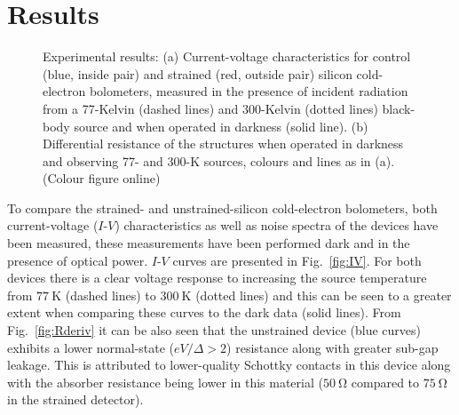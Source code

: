 \documentclass[final]{svjour2}
\begin{document}
\section{Results}
\begin{figure}[htb]
\centering
{}
\caption{Experimental results: (a) Current-voltage characteristics for control (blue, inside pair) and strained (red, outside pair) silicon cold-electron bolometers, measured in the presence of incident radiation from a 77-Kelvin (dashed lines) and 300-Kelvin (dotted lines) black-body source and when operated in darkness (solid line). (b) Differential resistance of the structures when operated in darkness and observing 77- and 300-K sources, colours and lines as in (a). (Colour figure online)}
\label{fig:data}
\end{figure}
To compare the strained- and unstrained-silicon cold-electron bolometers, both current-voltage ($I$-$V$) characteristics as well as noise spectra of the devices have been measured, these measurements have been performed dark and in the presence of optical power. $I$-$V$ curves are presented in Fig.~\ref{fig:IV}. For both devices there is a clear voltage response to increasing the source temperature from $77~\mathrm{K}$ (dashed lines) to $300~\mathrm{K}$ (dotted lines) and this can be seen to a greater extent when comparing these curves to the dark data (solid lines). From Fig.~\ref{fig:Rderiv} it can be also seen that the unstrained device (blue curves) exhibits a lower normal-state ($eV/\varDelta > 2$) resistance along with greater sub-gap leakage. This is attributed to lower-quality Schottky contacts in this device along with the absorber resistance being lower in this material ($50~\mathrm{\Omega}$ compared to $75~\mathrm{\Omega}$ in the strained detector).
\end{document}
